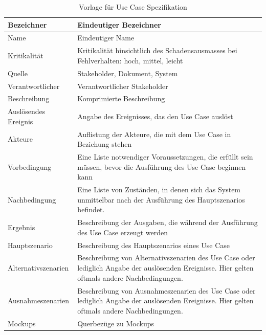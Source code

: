 \begin{table}[ht]
\centering
  \begin{tabular}{ l | p{10cm} }
	\hline
	\rowcolor{gray}
	Bezeichner		&	Eindeutiger Bezeichner\\ \hline
	Name			&	Eindeutiger Name\\ \hline
	Kritikalität		&	Kritikalität hinsichtlich des Schadensausmasses bei Fehlverhalten: hoch, mittel, leicht\\ \hline
	Quelle			&	Stakeholder, Dokument, System\\ \hline
	Verantwortlicher	&	Verantwortlicher Stakeholder\\ \hline
	Beschreibung	&	Komprimierte Beschreibung\\ \hline
	Auslösendes Ereignis&	Angabe des Ereignisses, das den Use Case auslöst\\ \hline
	Akteure		&	Auflistung der Akteure, die mit dem Use Case in Beziehung stehen\\ \hline
	Vorbedingung	&	Eine Liste notwendiger Voraussetzungen, die erfüllt sein müssen, bevor die Ausführung des Use Case beginnen kann\\ \hline
	Nachbedingung	&	Eine Liste von Zuständen, in denen sich das System unmittelbar nach der Ausführung des Hauptszenarios befindet.\\ \hline
	Ergebnis		&	Beschreibung der Ausgaben, die während der Ausführung des Use Case erzeugt werden\\ \hline
	Hauptszenario	&	Beschreibung des Hauptszenarios eines Use Case\\ \hline
	Alternativszenarien	&	Beschreibung von Alternativszenarien des Use Case oder lediglich Angabe der auslösenden Ereignisse. 
					Hier gelten oftmals andere Nachbedingungen.\\ \hline
	Ausnahmeszenarien&	Beschreibung von Ausnahmeszenarien des Use Case oder lediglich Angabe der auslösenden Ereignisse. 
					Hier gelten oftmals andere Nachbedingungen.\\ \hline
	Mockups	 	&	Querbezüge zu Mockups
  \end{tabular}
   \caption{Vorlage für Use Case Spezifikation}\label{table:use_case_template}
\end{table}

